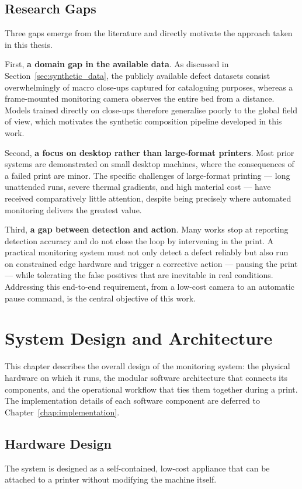 \documentclass[english, Lau, oneside]{sapthesis}
\begin{document}
\section{Research Gaps}
Three gaps emerge from the literature and directly motivate the approach taken in this thesis.

First, \textbf{a domain gap in the available data}. As discussed in Section~\ref{sec:synthetic_data}, the publicly available defect datasets consist overwhelmingly of macro close-ups captured for cataloguing purposes, whereas a frame-mounted monitoring camera observes the entire bed from a distance. Models trained directly on close-ups therefore generalise poorly to the global field of view, which motivates the synthetic composition pipeline developed in this work.

Second, \textbf{a focus on desktop rather than large-format printers}. Most prior systems are demonstrated on small desktop machines, where the consequences of a failed print are minor. The specific challenges of large-format printing --- long unattended runs, severe thermal gradients, and high material cost --- have received comparatively little attention, despite being precisely where automated monitoring delivers the greatest value.

Third, \textbf{a gap between detection and action}. Many works stop at reporting detection accuracy and do not close the loop by intervening in the print. A practical monitoring system must not only detect a defect reliably but also run on constrained edge hardware and trigger a corrective action --- pausing the print --- while tolerating the false positives that are inevitable in real conditions. Addressing this end-to-end requirement, from a low-cost camera to an automatic pause command, is the central objective of this work.

\chapter{System Design and Architecture}
\label{chap:architecture}

This chapter describes the overall design of the monitoring system: the physical hardware on which it runs, the modular software architecture that connects its components, and the operational workflow that ties them together during a print. The implementation details of each software component are deferred to Chapter~\ref{chap:implementation}.

\section{Hardware Design}
The system is designed as a self-contained, low-cost appliance that can be attached to a printer without modifying the machine itself.
\end{document}
